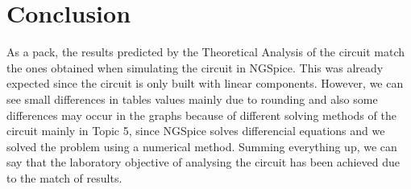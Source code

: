 \section{Conclusion}
\label{sec:conclusion}

As a pack, the results predicted by the Theoretical Analysis of the circuit match the ones obtained when simulating the circuit in NGSpice. This was already expected since the circuit is only built with linear components. However, we can see small differences in tables values mainly due to rounding and also some differences may occur in the graphs because of different solving methods of the circuit mainly in Topic 5, since NGSpice solves differencial equations and we solved the problem using a numerical method.
Summing everything up, we can say that the laboratory objective of analysing the circuit has been achieved due to the match of results.



